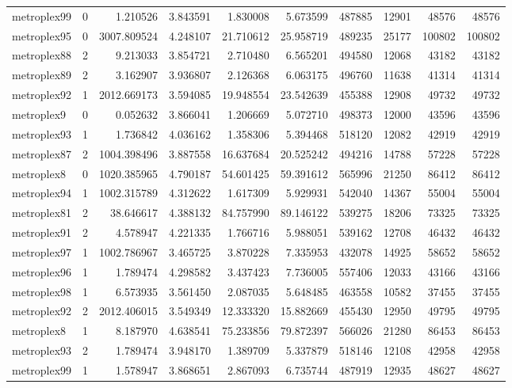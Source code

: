 \begin{longtable}{|l|r|r|r|r|r|r|r|r|r|}
metroplex99 & 0 & 1.210526 & 3.843591 & 1.830008 & 5.673599 & 487885 & 12901 & 48576 & 48576 \\
metroplex95 & 0 & 3007.809524 & 4.248107 & 21.710612 & 25.958719 & 489235 & 25177 & 100802 & 100802 \\
metroplex88 & 2 & 9.213033 & 3.854721 & 2.710480 & 6.565201 & 494580 & 12068 & 43182 & 43182 \\
metroplex89 & 2 & 3.162907 & 3.936807 & 2.126368 & 6.063175 & 496760 & 11638 & 41314 & 41314 \\
metroplex92 & 1 & 2012.669173 & 3.594085 & 19.948554 & 23.542639 & 455388 & 12908 & 49732 & 49732 \\
metroplex9 & 0 & 0.052632 & 3.866041 & 1.206669 & 5.072710 & 498373 & 12000 & 43596 & 43596 \\
metroplex93 & 1 & 1.736842 & 4.036162 & 1.358306 & 5.394468 & 518120 & 12082 & 42919 & 42919 \\
metroplex87 & 2 & 1004.398496 & 3.887558 & 16.637684 & 20.525242 & 494216 & 14788 & 57228 & 57228 \\
metroplex8 & 0 & 1020.385965 & 4.790187 & 54.601425 & 59.391612 & 565996 & 21250 & 86412 & 86412 \\
metroplex94 & 1 & 1002.315789 & 4.312622 & 1.617309 & 5.929931 & 542040 & 14367 & 55004 & 55004 \\
metroplex81 & 2 & 38.646617 & 4.388132 & 84.757990 & 89.146122 & 539275 & 18206 & 73325 & 73325 \\
metroplex91 & 2 & 4.578947 & 4.221335 & 1.766716 & 5.988051 & 539162 & 12708 & 46432 & 46432 \\
metroplex97 & 1 & 1002.786967 & 3.465725 & 3.870228 & 7.335953 & 432078 & 14925 & 58652 & 58652 \\
metroplex96 & 1 & 1.789474 & 4.298582 & 3.437423 & 7.736005 & 557406 & 12033 & 43166 & 43166 \\
metroplex98 & 1 & 6.573935 & 3.561450 & 2.087035 & 5.648485 & 463558 & 10582 & 37455 & 37455 \\
metroplex92 & 2 & 2012.406015 & 3.549349 & 12.333320 & 15.882669 & 455430 & 12950 & 49795 & 49795 \\
metroplex8 & 1 & 8.187970 & 4.638541 & 75.233856 & 79.872397 & 566026 & 21280 & 86453 & 86453 \\
metroplex93 & 2 & 1.789474 & 3.948170 & 1.389709 & 5.337879 & 518146 & 12108 & 42958 & 42958 \\
metroplex99 & 1 & 1.578947 & 3.868651 & 2.867093 & 6.735744 & 487919 & 12935 & 48627 & 48627 \\

\end{longtable}
